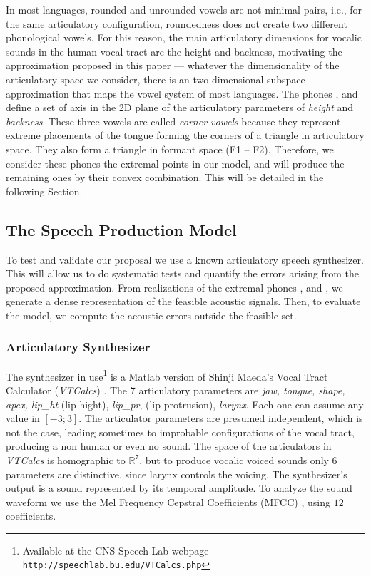 In most languages, rounded and unrounded vowels are not minimal pairs,
i.e., for the same articulatory configuration, roundedness does not
create two different phonological vowels. For this reason, the main
articulatory dimensions for vocalic sounds in the human vocal tract
are the height and backness, motivating the approximation proposed in
this paper --- whatever the dimensionality of the articulatory space
we consider, there is an two-dimensional subspace approximation that
maps the vowel system of most languages.
The phones  \textipa{[i]}, \textipa{[a]} and \textipa{[u]} define a
set of axis in the 2D plane of the articulatory parameters of
\emph{height} and \emph{backness}. These three vowels are called
\emph{corner vowels} because they represent extreme placements of the
tongue forming the corners of a triangle in articulatory space. They
also form a triangle in formant space (F1 --
F2)\cite{TITZE}. Therefore, we consider these phones the extremal
points in our model, and will produce the remaining ones by their
convex combination. This will be detailed in the following Section.

\subsection{The Speech Production Model}
To test and validate our proposal we use a known articulatory speech
synthesizer. This will allow us to do systematic tests and quantify
the errors arising from the proposed approximation. From realizations
of the extremal phones \textipa{[i]}, \textipa{[a]} and \textipa{[u]},
we generate a dense representation of the feasible acoustic
signals. Then, to evaluate the model, we compute the acoustic errors
outside the feasible set.

\subsubsection{Articulatory Synthesizer}
The synthesizer in use\footnote{Available at the CNS Speech Lab
  webpage \texttt{http://speechlab.bu.edu/VTCalcs.php}} is a Matlab
version of Shinji Maeda's Vocal Tract Calculator (\emph{VTCalcs})
\cite{MAEDA}. The 7 articulatory parameters are \emph{jaw, tongue,
  shape, apex, lip\_ht} (lip hight), \emph{lip\_pr}, (lip protrusion),
\emph{larynx}. Each one can assume any value in $[-3;3]$. The
articulator parameters are presumed independent, which is not the
case, leading sometimes to improbable configurations of the vocal
tract, producing a non human or even no sound.
The space of the articulators in  \emph{VTCalcs} is homographic to
$\mathds{R}^{7}$, but to produce vocalic voiced sounds only 6
parameters are distinctive, since larynx controls the voicing. The
synthesizer's output is a sound represented by its temporal
amplitude. To analyze the sound waveform we use the Mel Frequency
Cepstral Coefficients (MFCC) \cite{Davis80}, using $12$ coefficients.

